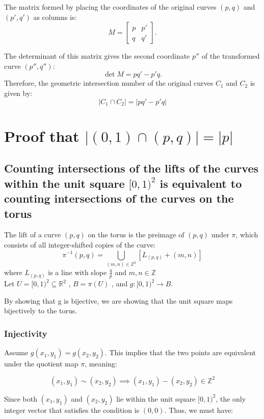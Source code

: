 \documentclass[11pt]{article}
\begin{document}
\noindent
The matrix formed by placing the coordinates of the original curves \((p, q)\) and \((p', q')\) as columns is:
\[
M = \begin{bmatrix} p & p' \\ q & q' \end{bmatrix}.
\]

\noindent
The determinant of this matrix gives the second coordinate \(p''\) of the transformed curve \((p'', q'')\):
\[
\det M = pq' - p'q.
\]
Therefore, the geometric intersection number of the original curves \(C_1\) and \(C_2\) is given by:
\[ |C_1 \cap C_2| = \left| pq' - p'q \right|\]




\section{Proof that \(|(0,1) \cap (p, q)| = |p|\)}
\label{sec:orgccad29d}

\subsection{Counting intersections of the lifts of the curves within the unit square \([0, 1)^2\) is equivalent to counting intersections of the curves on the torus}
\label{sec:orgc7491cd}

The lift of a curve \((p, q)\) on the torus is the preimage of \((p, q)\) under \(\pi\), which consists of all integer-shifted copies of the curve:
\[
\pi^{-1}(p, q) = \bigcup_{(m, n) \in \mathbb{Z}^2} [L_{(p, q)} + (m, n)]
\]
where \(L_{(p, q)}\) is a line with slope \(\frac{q}{p}\) and  \(m,n \in \mathbb{Z}\) \\[0pt]
\noindent
Let \(U = [0,1)^2 \subseteq \mathbb{R}^2\) , \(B = \pi(U)\) , and \(g: [0,1)^2 \to B\).

By showing that g is bijective, we are showing that the unit square maps bijectively to the torus.

\subsubsection{Injectivity}
\label{sec:org3901c83}
Assume \(g(x_1, y_1) = g(x_2, y_2)\). This implies that the two points are equivalent under the quotient map \(\pi\), meaning:

\[
(x_1, y_1) \sim (x_2, y_2) \implies (x_1, y_1) - (x_2, y_2) \in \mathbb{Z}^2
\]

Since both \((x_1, y_1)\) and \((x_2, y_2)\) lie within the unit square \([0,1)^2\), the only integer vector that satisfies the condition is \((0,0)\). Thus, we must have:
\end{document}
